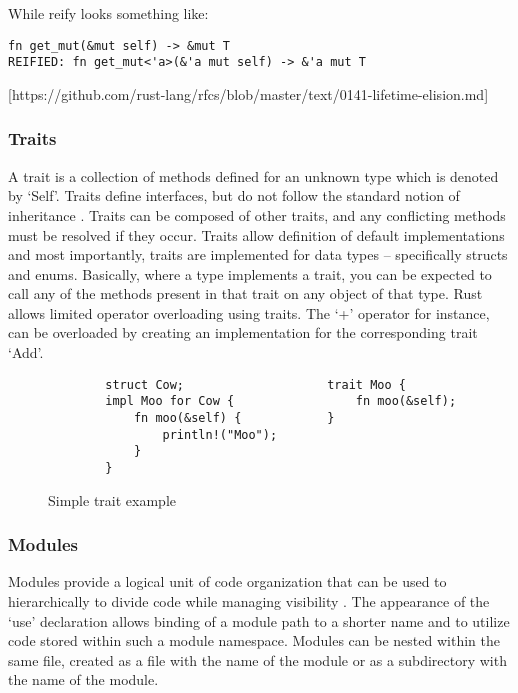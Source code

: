 While reify looks something like:
\begin{verbatim}
fn get_mut(&mut self) -> &mut T
REIFIED: fn get_mut<'a>(&'a mut self) -> &'a mut T
\end{verbatim}

[https://github.com/rust-lang/rfcs/blob/master/text/0141-lifetime-elision.md]

\subsubsection{Traits}
A trait is a collection of methods defined for an unknown type which is denoted by `Self'. Traits define interfaces, but do not follow the standard notion of inheritance \cite{traitexample15}. Traits can be composed of other traits, and any conflicting methods must be resolved if they occur. Traits allow definition of default implementations and most importantly, traits are implemented for data types -- specifically structs and enums. Basically, where a type implements a trait, you can be expected to call any of the methods present in that trait on any object of that type. Rust allows limited operator overloading using traits. The `+' operator for instance, can be overloaded by creating an implementation for the corresponding trait `Add'.

\begin{figure}[H]
\centering
\begin{verbatim}
        struct Cow;                    trait Moo {
        impl Moo for Cow {                 fn moo(&self);    
            fn moo(&self) {            }
                println!("Moo");                     
            }
        }
\end{verbatim}
\caption{Simple trait example}
\end{figure}

\subsubsection{Modules}
Modules provide a logical unit of code organization that can be used to hierarchically to divide code while managing visibility \cite{docmod15}. The appearance of the `use' declaration allows binding of a module path to a shorter name and to utilize code stored within such a module namespace. Modules can be nested within the same file, created as a file with the name of the module or as a subdirectory with the name of the module.


